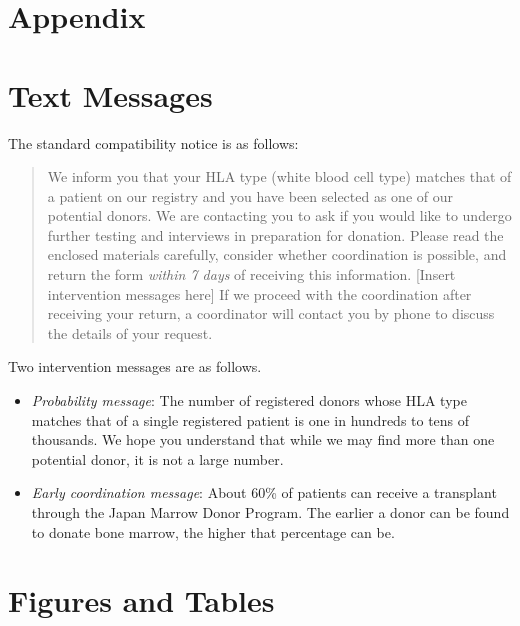 \documentclass[12pt, a4paper]{article}
\providecommand{\tightlist}{%
  \setlength{\itemsep}{0pt}\setlength{\parskip}{0pt}}
\begin{document}
\appendix

\hypertarget{appendix}{%
\section*{Appendix}\label{appendix}}

\hypertarget{message}{%
\section{Text Messages}\label{message}}

The standard compatibility notice is as follows:

\begin{quote}
We inform you that your HLA type (white blood cell type) matches that of a patient on our registry and you have been selected as one of our potential donors. We are contacting you to ask if you would like to undergo further testing and interviews in preparation for donation. Please read the enclosed materials carefully, consider whether coordination is possible, and return the form \emph{within 7 days} of receiving this information. {[}Insert intervention messages here{]} If we proceed with the coordination after receiving your return, a coordinator will contact you by phone to discuss the details of your request.
\end{quote}

Two intervention messages are as follows.

\begin{itemize}
\tightlist
\item
  \emph{Probability message}: The number of registered donors whose HLA type matches that of a single registered patient is one in hundreds to tens of thousands. We hope you understand that while we may find more than one potential donor, it is not a large number.
\item
  \emph{Early coordination message}: About 60\% of patients can receive a transplant through the Japan Marrow Donor Program. The earlier a donor can be found to donate bone marrow, the higher that percentage can be.
\end{itemize}

\setcounter{figure}{0}
\setcounter{table}{0}
\renewcommand\thefigure{\thesection\arabic{figure}}
\renewcommand{\thetable}{\thesection\arabic{table}}
\renewcommand{\theHfigure}{\thesection\arabic{figure}}
\renewcommand{\theHtable}{\thesection\arabic{table}}

\hypertarget{figtab}{%
\section{Figures and Tables}\label{figtab}}
\end{document}
